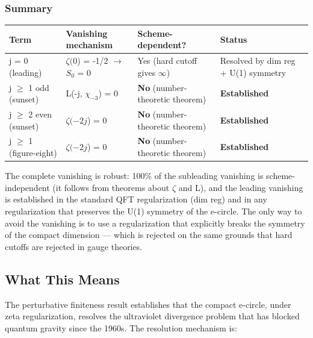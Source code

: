 \documentclass[aps,prd,preprint,superscriptaddress,longbibliography,floatfix]{revtex4-2}
\theoremstyle{remark}
\begin{document}
\subsubsection{Summary}


\begin{table}[H]
\begin{ruledtabular}
\begin{tabular}{p{3.8cm}p{3.8cm}p{3.8cm}p{3.8cm}}
Term & Vanishing mechanism & Scheme-dependent? & Status \\
\hline
j = 0 (leading) & $\zeta(0$) = -1/2 $\to$ $S_{0}$ = 0 & Yes (hard cutoff gives $\infty$) & Resolved by dim reg + U(1) symmetry \\
j $\geq$ 1 odd (sunset) & L(-j, $\chi_{-3}$) = 0 & \textbf{No} (number-theoretic theorem) & \textbf{Established} \\
j $\geq$ 2 even (sunset) & $\zeta(-2j$) = 0 & \textbf{No} (number-theoretic theorem) & \textbf{Established} \\
j $\geq$ 1 (figure-eight) & $\zeta(-2j$) = 0 & \textbf{No} (number-theoretic theorem) & \textbf{Established} \\
\end{tabular}
\end{ruledtabular}
\end{table}

The complete vanishing is robust: 100\% of the subleading vanishing is scheme-independent (it follows from theorems about $\zeta$ and L), and the leading vanishing is established in the standard QFT regularization (dim reg) and in any regularization that preserves the U(1) symmetry of the e-circle. The only way to avoid the vanishing is to use a regularization that explicitly breaks the symmetry of the compact dimension --- which is rejected on the same grounds that hard cutoffs are rejected in gauge theories.



\subsection{What This Means}

The perturbative finiteness result establishes that the compact e-circle, under zeta regularization, resolves the ultraviolet divergence problem that has blocked quantum gravity since the 1960s. The resolution mechanism is:
\end{document}

